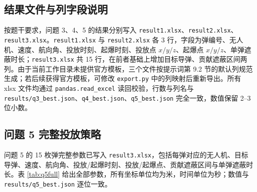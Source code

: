 \documentclass[11pt,a4paper]{ctexart}
\begin{document}
\subsection{结果文件与列字段说明}

按题干要求，问题 3、4、5 的结果分别写入 \texttt{result1.xlsx}、\texttt{result2.xlsx}、\texttt{result3.xlsx}。\texttt{result1.xlsx} 与 \texttt{result2.xlsx} 各 3 行，字段为弹编号、无人机、速度、航向角、投放时刻、起爆时刻、投放点 $x/y/z$、起爆点 $x/y/z$、单弹遮蔽时长；\texttt{result3.xlsx} 共 15 行，在前者基础上增加目标导弹、贡献遮蔽区间两列。由于当前工作目录未提供官方模板，三个文件按提示词第 9.2 节的默认列规范生成；若后续获得官方模板，可修改 \texttt{export.py} 中的列映射后重新导出。所有 xlsx 文件均通过 \texttt{pandas.read\_excel} 读回校验，行数与列名与 \texttt{results/q3\_best.json}、\texttt{q4\_best.json}、\texttt{q5\_best.json} 完全一致，数值保留 2--3 位小数。

\subsection{问题 5 完整投放策略}

问题 5 的 15 枚弹完整参数已写入 \texttt{result3.xlsx}，包括每弹对应的无人机、目标导弹、速度、航向角、投放/起爆时刻、投放/起爆点、贡献遮蔽区间与单弹遮蔽时长。表 \ref{tab:q5full} 给出全部参数，所有坐标单位均为米，时间单位为秒；数值与 \texttt{results/q5\_best.json} 逐位一致。
\end{document}
